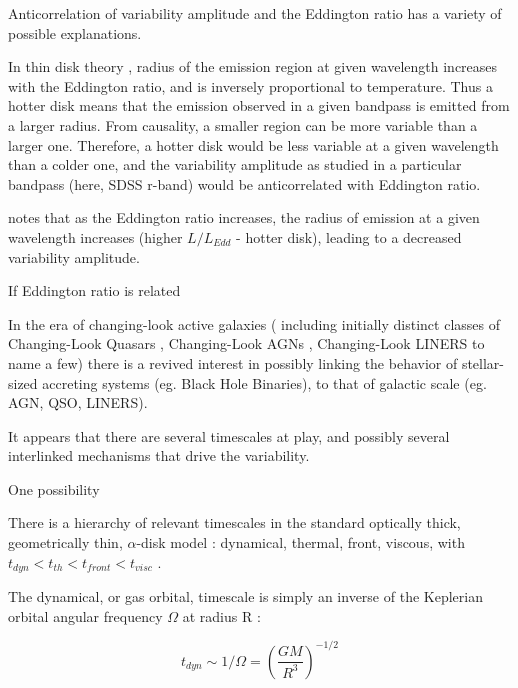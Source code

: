 \documentclass[twocolumn]{aastex62}
\begin{document}
Anticorrelation of  variability amplitude and the Eddington ratio  has a variety of possible explanations. 

In thin disk theory \cite{shakura1973, frank2002, netzer2013}, radius of the emission region at given wavelength increases with the Eddington ratio, and is inversely proportional to temperature\cite{rakshit2017}. Thus a hotter disk means that the emission observed in a given bandpass is emitted from a larger radius. From causality, a smaller region can be more variable than a larger one. Therefore, a  hotter disk would be less variable at a given wavelength than a colder one, and  the variability amplitude as studied in a particular bandpass (here, SDSS r-band) would be anticorrelated with Eddington ratio. 




\cite{rakshit2017}  notes that as the Eddington ratio increases,  the radius of emission at a given wavelength increases (higher $L/L_{Edd}$ - hotter disk), leading to a decreased variability amplitude. 

 If Eddington ratio is related 


In the era of changing-look active galaxies ( including initially distinct classes of Changing-Look Quasars \citep{lamassa2015, macleod2019}, Changing-Look AGNs \citep{marchese2012, bianchi2009,risaliti2009}, Changing-Look LINERS \citep{frederick2019} to name a few) there is a revived interest in possibly linking the behavior of stellar-sized accreting systems (eg. Black Hole Binaries),  to that of galactic scale (eg. AGN, QSO, LINERS)\citep{noda2018}. 

It appears that there are several timescales at play, and possibly several interlinked mechanisms that drive the variability. 



One possibility

There is a hierarchy of relevant timescales in the standard optically thick, geometrically thin, $\alpha$-disk model : dynamical, thermal, front, viscous, with   $t_{dyn} < t_{th} < t_{front}  < t_{visc} $ \citep{netzer2013, frank2002}. 

The dynamical, or gas orbital, timescale is simply  an inverse of the Keplerian orbital angular frequency $ \Omega$  at radius R  : 

\begin{equation}
t_{dyn} \sim  1 / \Omega = \left( \frac{GM}{R^{3}}\right)^{-1/2}
\end{equation}
\end{document}
